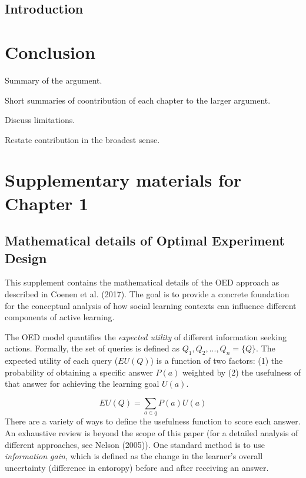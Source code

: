 \documentclass[oneside]{report}
\begin{document}
\section{Introduction}\label{introduction-4}

\chapter*{Conclusion}\label{conclusion}

Summary of the argument.

Short summaries of coontribution of each chapter to the larger argument.

Discuss limitations.

Restate contribution in the broadest sense.

\appendix

\chapter{Supplementary materials for Chapter
1}\label{supplementary-materials-for-chapter-1}

\section{Mathematical details of Optimal Experiment
Design}\label{mathematical-details-of-optimal-experiment-design}

This supplement contains the mathematical details of the OED approach as
described in Coenen et al. (2017). The goal is to provide a concrete
foundation for the conceptual analysis of how social learning contexts
can influence different components of active learning.

The OED model quantifies the \emph{expected utility} of different
information seeking actions. Formally, the set of queries is defined as
\(Q_1, Q_2,..., Q_n = \{Q\}\). The expected utility of each query
(\(EU(Q)\)) is a function of two factors: (1) the probability of
obtaining a specific answer \(P(a)\) weighted by (2) the usefulness of
that answer for achieving the learning goal \(U(a)\).

\[EU(Q) = \sum_{a\in q}{P(a)U(a)}\] \noindent
There are a variety of ways to define the usefulness function to score
each answer. An exhaustive review is beyond the scope of this paper (for
a detailed analysis of different approaches, see Nelson (2005)). One
standard method is to use \emph{information gain}, which is defined as
the change in the learner's overall uncertainty (difference in entoropy)
before and after receiving an answer.
\end{document}
